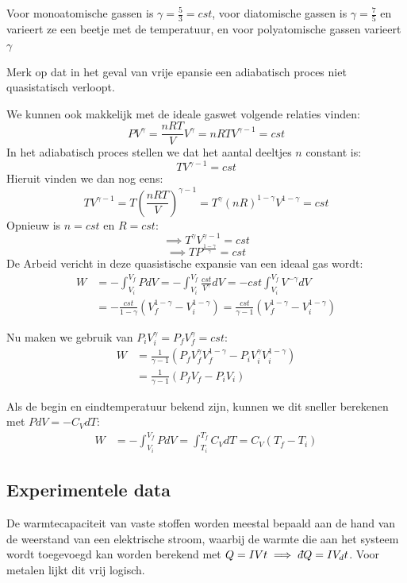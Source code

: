 Voor monoatomische gassen is \(\gamma = \frac{5}{3} = cst\), voor diatomische gassen is \(\gamma = \frac{7}{5}\) en varieert ze een beetje met de temperatuur, en voor polyatomische gassen varieert \(\gamma\) 

Merk op dat in het geval van vrije epansie een adiabatisch proces niet quasistatisch verloopt.

We kunnen ook makkelijk met de ideale gaswet volgende relaties vinden:
\[ PV^\gamma = \frac{nRT}{V} V^\gamma = nRTV^{\gamma-1} = cst \]
In het adiabatisch proces stellen we dat het aantal deeltjes \(n\) constant is:
\[TV^{\gamma -1} = cst\]
Hieruit vinden we dan nog eens:
\[TV^{\gamma -1} = T \left( \frac{nRT}{V}\right)^{\gamma-1} = T^{\gamma}(nR)^{1-\gamma} V^{1-\gamma} = cst\]
Opnieuw is \(n = cst\) en \(R = cst\):
\[\implies T^{\gamma}V^{\gamma -1} = cst\]
\[\implies TP^{\frac{1-\gamma}{\gamma}} = cst\]
De Arbeid vericht in deze quasistische expansie van een ideaal gas wordt:
\begin{align*}
    W &= -\int_{V_i}^{V_f} PdV = -\int_{V_i}^{V_f} \frac{cst}{V^\gamma} dV = -cst \int_{V_i}^{V_f} V^{-\gamma} dV \\
    &= -\frac{cst}{1-\gamma} \left( V_f^{1-\gamma} - V_i^{1-\gamma} \right) = \frac{cst}{\gamma - 1} \left( V_f^{1-\gamma} - V_i^{1-\gamma} \right)
\end{align*}

Nu maken we gebruik van \(P_i V_i^\gamma = P_f V_f^\gamma = cst \):
\begin{align*}
    W &= \frac{1}{\gamma - 1} \left( P_f V_f^\gamma V_f^{1-\gamma} - P_i V_i^\gamma V_i^{1-\gamma} \right)\\
    &= \frac{1}{\gamma - 1} (P_f V_f - P_i V_i)
\end{align*}

Als de begin en eindtemperatuur bekend zijn, kunnen we dit sneller berekenen met \(PdV = -C_V dT\):
\begin{align*}
    W &= -\int_{V_i}^{V_f} PdV = \int_{T_i}^{T_f} C_V dT = C_V (T_f - T_i)
\end{align*}

\subsection{Experimentele data}

De warmtecapaciteit van vaste stoffen worden meestal bepaald aan de hand van de weerstand van een elektrische stroom,
waarbij de warmte die aan het systeem wordt toegevoegd kan worden berekend met \(Q = IVt \implies \dbar Q = I V_ dt\).
Voor metalen lijkt dit vrij logisch.

